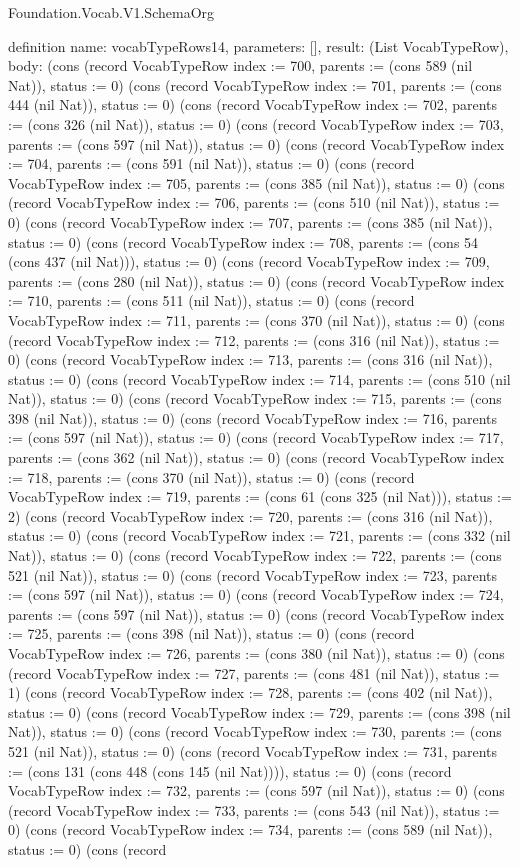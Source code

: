 \begin{lexlean}{Foundation.Vocab.V1.SchemaOrg}
\begin{semanticmodule}
definition{
  name: vocabTypeRows14,
  parameters: [],
  result: (List VocabTypeRow),
  body: (cons (record VocabTypeRow {index := 700, parents := (cons 589 (nil Nat)), status := 0}) (cons (record VocabTypeRow {index := 701, parents := (cons 444 (nil Nat)), status := 0}) (cons (record VocabTypeRow {index := 702, parents := (cons 326 (nil Nat)), status := 0}) (cons (record VocabTypeRow {index := 703, parents := (cons 597 (nil Nat)), status := 0}) (cons (record VocabTypeRow {index := 704, parents := (cons 591 (nil Nat)), status := 0}) (cons (record VocabTypeRow {index := 705, parents := (cons 385 (nil Nat)), status := 0}) (cons (record VocabTypeRow {index := 706, parents := (cons 510 (nil Nat)), status := 0}) (cons (record VocabTypeRow {index := 707, parents := (cons 385 (nil Nat)), status := 0}) (cons (record VocabTypeRow {index := 708, parents := (cons 54 (cons 437 (nil Nat))), status := 0}) (cons (record VocabTypeRow {index := 709, parents := (cons 280 (nil Nat)), status := 0}) (cons (record VocabTypeRow {index := 710, parents := (cons 511 (nil Nat)), status := 0}) (cons (record VocabTypeRow {index := 711, parents := (cons 370 (nil Nat)), status := 0}) (cons (record VocabTypeRow {index := 712, parents := (cons 316 (nil Nat)), status := 0}) (cons (record VocabTypeRow {index := 713, parents := (cons 316 (nil Nat)), status := 0}) (cons (record VocabTypeRow {index := 714, parents := (cons 510 (nil Nat)), status := 0}) (cons (record VocabTypeRow {index := 715, parents := (cons 398 (nil Nat)), status := 0}) (cons (record VocabTypeRow {index := 716, parents := (cons 597 (nil Nat)), status := 0}) (cons (record VocabTypeRow {index := 717, parents := (cons 362 (nil Nat)), status := 0}) (cons (record VocabTypeRow {index := 718, parents := (cons 370 (nil Nat)), status := 0}) (cons (record VocabTypeRow {index := 719, parents := (cons 61 (cons 325 (nil Nat))), status := 2}) (cons (record VocabTypeRow {index := 720, parents := (cons 316 (nil Nat)), status := 0}) (cons (record VocabTypeRow {index := 721, parents := (cons 332 (nil Nat)), status := 0}) (cons (record VocabTypeRow {index := 722, parents := (cons 521 (nil Nat)), status := 0}) (cons (record VocabTypeRow {index := 723, parents := (cons 597 (nil Nat)), status := 0}) (cons (record VocabTypeRow {index := 724, parents := (cons 597 (nil Nat)), status := 0}) (cons (record VocabTypeRow {index := 725, parents := (cons 398 (nil Nat)), status := 0}) (cons (record VocabTypeRow {index := 726, parents := (cons 380 (nil Nat)), status := 0}) (cons (record VocabTypeRow {index := 727, parents := (cons 481 (nil Nat)), status := 1}) (cons (record VocabTypeRow {index := 728, parents := (cons 402 (nil Nat)), status := 0}) (cons (record VocabTypeRow {index := 729, parents := (cons 398 (nil Nat)), status := 0}) (cons (record VocabTypeRow {index := 730, parents := (cons 521 (nil Nat)), status := 0}) (cons (record VocabTypeRow {index := 731, parents := (cons 131 (cons 448 (cons 145 (nil Nat)))), status := 0}) (cons (record VocabTypeRow {index := 732, parents := (cons 597 (nil Nat)), status := 0}) (cons (record VocabTypeRow {index := 733, parents := (cons 543 (nil Nat)), status := 0}) (cons (record VocabTypeRow {index := 734, parents := (cons 589 (nil Nat)), status := 0}) (cons (record }
\end{semanticmodule}
\end{lexlean}
